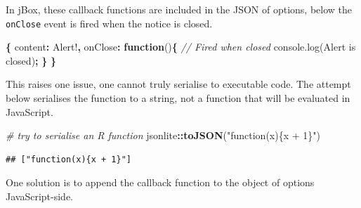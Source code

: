 \documentclass[
]{krantz}
\makeatletter
\newenvironment{Shaded}{\begin{snugshade}}{\end{snugshade}}
\newcommand{\AttributeTok}[1]{\textcolor[rgb]{0.61,0.61,0.61}{#1}}
\newcommand{\CommentTok}[1]{\textcolor[rgb]{0.37,0.37,0.37}{\textit{#1}}}
\newcommand{\DataTypeTok}[1]{\textcolor[rgb]{0.27,0.27,0.27}{#1}}
\newcommand{\KeywordTok}[1]{\textcolor[rgb]{0.27,0.27,0.27}{\textbf{#1}}}
\newcommand{\NormalTok}[1]{#1}
\newcommand{\OperatorTok}[1]{\textcolor[rgb]{0.43,0.43,0.43}{\textbf{#1}}}
\newcommand{\StringTok}[1]{\textcolor[rgb]{0.5,0.5,0.5}{#1}}
\newcommand{\VariableTok}[1]{\textcolor[rgb]{0,0,0}{#1}}
\newenvironment{kframe}{%
\medskip{}
\setlength{\fboxsep}{.8em}
 \def\at@end@of@kframe{}%
 \ifinner\ifhmode%
  \def\at@end@of@kframe{\end{minipage}}%
  \begin{minipage}{\columnwidth}%
 \fi\fi%
 \def\FrameCommand##1{\hskip\@totalleftmargin \hskip-\fboxsep
 \colorbox{shadecolor}{##1}\hskip-\fboxsep
     \hskip-\linewidth \hskip-\@totalleftmargin \hskip\columnwidth}%
 \MakeFramed {\advance\hsize-\width
   \@totalleftmargin\z@ \linewidth\hsize
   \@setminipage}}%
 {\par\unskip\endMakeFramed%
 \at@end@of@kframe}
\renewenvironment{Shaded}{\begin{kframe}}{\end{kframe}}
\makeatother
\begin{document}
In jBox, these callback functions are included in the JSON of options, below the \texttt{onClose} event is fired when the notice is closed.

\begin{Shaded}
\begin{Highlighting}[]
\OperatorTok{\{}
  \DataTypeTok{content}\OperatorTok{:} \StringTok{\textquotesingle{}Alert!\textquotesingle{}}\OperatorTok{,}
  \DataTypeTok{onClose}\OperatorTok{:} \KeywordTok{function}\NormalTok{()}\OperatorTok{\{}
    \CommentTok{// Fired when closed }
    \VariableTok{console}\NormalTok{.}\AttributeTok{log}\NormalTok{(}\StringTok{\textquotesingle{}Alert is closed\textquotesingle{}}\NormalTok{)}\OperatorTok{;}
  \OperatorTok{\}}
\OperatorTok{\}}
\end{Highlighting}
\end{Shaded}

This raises one issue, one cannot truly serialise to executable code. The attempt below serialises the function to a string, not a function that will be evaluated in JavaScript.

\begin{Shaded}
\begin{Highlighting}[]
\CommentTok{\# try to serialise an R function}
\NormalTok{jsonlite}\OperatorTok{::}\KeywordTok{toJSON}\NormalTok{(}\StringTok{"function(x)\{x + 1\}"}\NormalTok{)}
\end{Highlighting}
\end{Shaded}

\begin{verbatim}
## ["function(x){x + 1}"]
\end{verbatim}

One solution is to append the callback function to the object of options JavaScript-side.

\begin{Shaded}
\end{Shaded}
\end{document}
